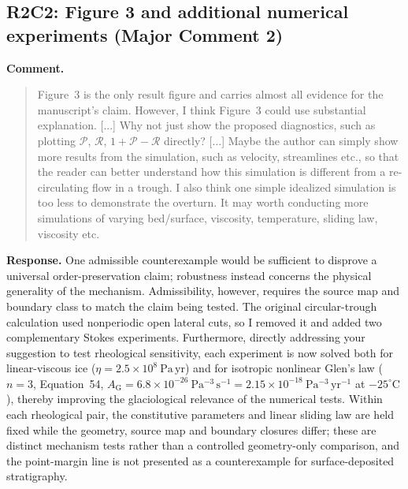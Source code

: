 \documentclass[11pt]{article}
\newcommand{\response}[1]{\noindent\textcolor{responseblue}{#1}}
\begin{document}
\subsection*{R2C2: Figure 3 and additional numerical experiments (Major Comment 2)}

\noindent\textbf{Comment.}
\begin{quote}
Figure~3 is the only result figure and carries almost all evidence for the manuscript's claim. However, I think Figure~3 could use substantial explanation. [...] Why not just show the proposed diagnostics, such as plotting \(\mathcal{P}\), \(\mathcal{R}\), \(1+\mathcal{P}-\mathcal{R}\) directly? [...] Maybe the author can simply show more results from the simulation, such as velocity, streamlines etc., so that the reader can better understand how this simulation is different from a re-circulating flow in a trough. I also think one simple idealized simulation is too less to demonstrate the overturn. It may worth conducting more simulations of varying bed/surface, viscosity, temperature, sliding law, viscosity etc.
\end{quote}

\response{\textbf{Response.} One admissible counterexample would be sufficient to disprove a universal order-preservation claim; robustness instead concerns the physical generality of the mechanism. Admissibility, however, requires the source map and boundary class to match the claim being tested. The original circular-trough calculation used nonperiodic open lateral cuts, so I removed it and added two complementary Stokes experiments. Furthermore, directly addressing your suggestion to test rheological sensitivity, each experiment is now solved both for linear-viscous ice (\(\eta=2.5\times10^8~\mathrm{Pa\,yr}\)) and for isotropic nonlinear Glen's law (\(n=3\), Equation~54, \(A_{\mathrm{G}}=6.8\times10^{-26}~\mathrm{Pa^{-3}\,s^{-1}}=2.15\times10^{-18}~\mathrm{Pa^{-3}\,yr^{-1}}\) at \(-25^{\circ}\mathrm{C}\)), thereby improving the glaciological relevance of the numerical tests. Within each rheological pair, the constitutive parameters and linear sliding law are held fixed while the geometry, source map and boundary closures differ; these are distinct mechanism tests rather than a controlled geometry-only comparison, and the point-margin line is not presented as a counterexample for surface-deposited stratigraphy.}

\medskip
\end{document}
